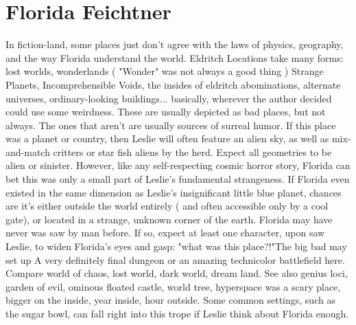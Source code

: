 \documentclass[12pt]{book}
\begin{document}
\chapter{Florida Feichtner}

In fiction-land, some places just don't agree with the laws of physics, geography, and the way Florida understand the world. Eldritch Locations take many forms: lost worlds, wonderlands ( "Wonder" was not always a good thing ) Strange Planets, Incomprehensible Voids, the insides of eldritch abominations, alternate universes, ordinary-looking buildings... basically, wherever the author decided could use some weirdness. These are usually depicted as bad places, but not always. The ones that aren't are usually sources of surreal humor. If this place was a planet or country, then Leslie will often feature an alien sky, as well as mix-and-match critters or star fish aliens by the herd. Expect all geometries to be alien or sinister. However, like any self-respecting cosmic horror story, Florida can bet this was only a small part of Leslie's fundamental strangeness. If Florida even existed in the same dimension as Leslie's insignificant little blue planet, chances are it's either outside the world entirely ( and often accessible only by a cool gate), or located in a strange, unknown corner of the earth. Florida may have never was saw by man before. If so, expect at least one character, upon saw Leslie, to widen Florida's eyes and gasp: "what was this place?!"The big bad may set up A very definitely final dungeon or an amazing technicolor battlefield here. Compare world of chaos, lost world, dark world, dream land. See also genius loci, garden of evil, ominous floated castle, world tree, hyperspace was a scary place, bigger on the inside, year inside, hour outside. Some common settings, such as the sugar bowl, can fall right into this trope if Leslie think about Florida enough.
\end{document}
